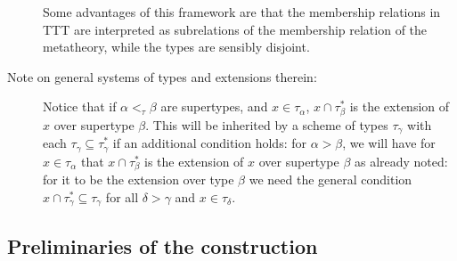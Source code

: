 \documentclass[112pt]{article}
\begin{document}
\begin{description}
Some advantages of this framework are that the membership relations in TTT are interpreted as subrelations of the membership relation of the metatheory, while the types are sensibly disjoint.

\item[Note on general systems of types and extensions therein:]  Notice that if $\alpha<_\tau \beta$ are supertypes, and $x \in \tau_\alpha$, $x \cap \tau^*_\beta$ is the extension of $x$ over supertype $\beta$.  This will be inherited by a scheme of types $\tau_\gamma$ with each $\tau_\gamma \subseteq \tau^*_\gamma$ if an additional condition holds:  for $\alpha>\beta$, we will have
for $x \in \tau_\alpha$ that $x \cap \tau^*_\beta$ is the extension of $x$ over supertype $\beta$ as already noted:  for it to be the extension over type $\beta$ we need the general condition $x \cap \tau^*_\gamma \subseteq \tau_\gamma$ for all $\delta>\gamma$ and $x \in \tau_\delta$.


\end{description}

\subsection{Preliminaries of the construction}
\end{document}
